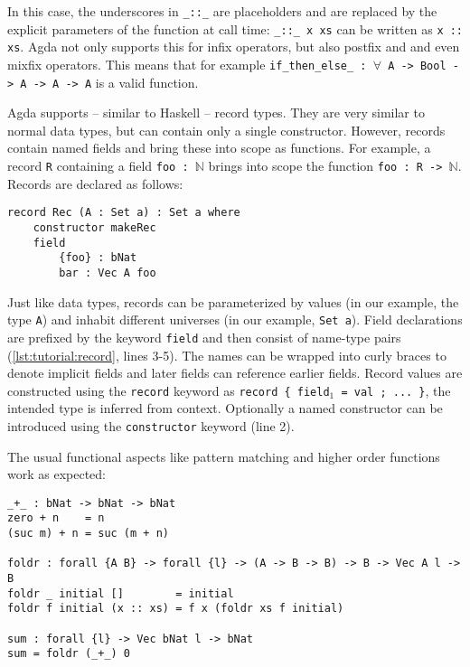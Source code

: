 In this case, the underscores in \texttt{\_::\_} are placeholders and are replaced by the explicit parameters of the function at call time: \texttt{\_::\_ x xs} can be written as \texttt{x :: xs}. Agda not only supports this for infix operators, but also postfix and and even mixfix operators. This means that for example \texttt{if\_then\_else\_ : $\forall$ {A} -> Bool -> A -> A -> A} is a valid function.

Agda supports -- similar to Haskell -- record types. They are very similar to normal data types, but can contain only a single constructor. However, records contain named fields and bring these into scope as functions. For example, a record \texttt{R} containing a field \texttt{foo : $\mathbb N$} brings into scope the function \texttt{foo : R -> $\mathbb N$}. Records are declared as follows:

\noindent\begin{minipage}{\linewidth}
\begin{lstlisting}[caption={Record type declaration},label={lst:tutorial:record},emph={Rec,makeRec,foo,bar}]
record Rec (A : Set a) : Set a where
    constructor makeRec
    field
        {foo} : bNat
        bar : Vec A foo
\end{lstlisting}
\end{minipage}

Just like data types, records can be parameterized by values (in our example, the type \texttt{A}) and inhabit different universes (in our example, \texttt{Set a}). Field declarations are prefixed by the keyword \texttt{field} and then consist of name-type pairs (\autoref{lst:tutorial:record}, lines 3-5). The names can be wrapped into curly braces to denote implicit fields and later fields can reference earlier fields. Record values are constructed using the \texttt{record} keyword as \texttt{record \{ field$_1$ = val ; ... \}}, the intended type is inferred from context. Optionally a named constructor can be introduced using the \texttt{constructor} keyword (line 2).

The usual functional aspects like pattern matching and higher order functions work as expected:

\begin{lstlisting}[caption={Pattern matching and higher order functions},label={lst:tutorial:functional},emph={foldr,sum}]
_+_ : bNat -> bNat -> bNat
zero + n    = n
(suc m) + n = suc (m + n)

foldr : forall {A B} -> forall {l} -> (A -> B -> B) -> B -> Vec A l -> B
foldr _ initial []        = initial
foldr f initial (x :: xs) = f x (foldr xs f initial)

sum : forall {l} -> Vec bNat l -> bNat
sum = foldr (_+_) 0
\end{lstlisting}


